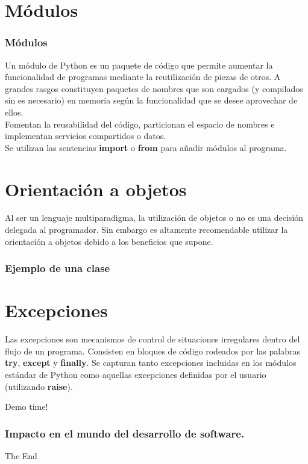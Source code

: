 \documentclass{beamer}
\begin{document}
\section{Módulos}
\begin{frame}
\frametitle{Módulos}
Un módulo de Python es un paquete de código que permite aumentar la funcionalidad de programas mediante la reutilización de piezas de otros. A grandes rasgos constituyen paquetes de nombres que son cargados (y compilados sin es necesario) en memoria según la funcionalidad que se desee aprovechar de ellos.\\
Fomentan la reusabilidad del código, particionan el espacio de nombres e implementan servicios compartidos o datos.\\
Se utilizan las sentencias \textbf{import} o \textbf{from} para añadir módulos al programa.
\end{frame}

\section{Orientación a objetos}
\begin{frame}
Al ser un lenguaje multiparadigma, la utilización de objetos o no es una decisión delegada al programador. Sin embargo es altamente recomendable utilizar la orientación a objetos debido a los beneficios que supone.
\end{frame}

\begin{frame}
\frametitle{Ejemplo de una clase}
\end{frame}

\section{Excepciones}
\begin{frame}
Las excepciones son mecanismos de control de situaciones irregulares dentro del flujo de un programa. Consisten en bloques de código rodeados por las palabras \textbf{try}, \textbf{except} y \textbf{finally}. Se capturan tanto excepciones incluidas en los módulos estándar de Python como aquellas excepciones definidas por el usuario (utilizando \textbf{raise}).
\end{frame}

\begin{frame}
Demo time!
\end{frame}

\begin{frame}
\frametitle{Impacto en el mundo del desarrollo de software.}
\end{frame}

\begin{frame}
\Huge{\centerline{The End}}
\end{frame}

\end{document}
